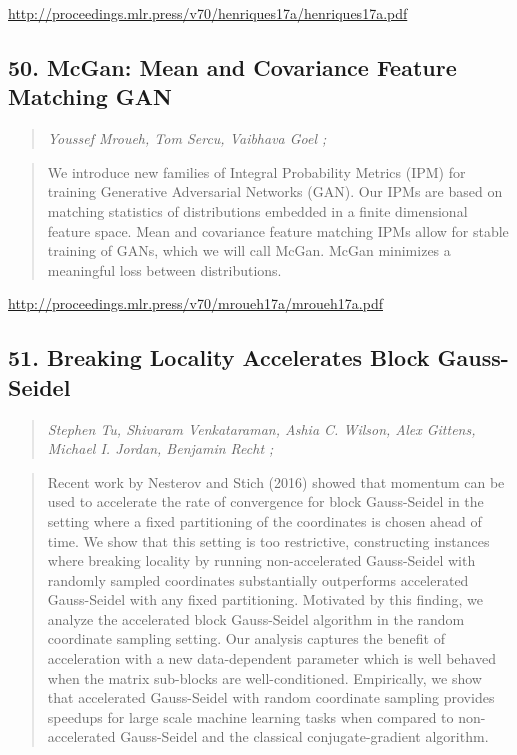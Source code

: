 \documentclass{article}
\begin{document}
\href{http://proceedings.mlr.press/v70/henriques17a/henriques17a.pdf}{http://proceedings.mlr.press/v70/henriques17a/henriques17a.pdf}

\subsection{50. McGan: Mean and Covariance Feature Matching GAN}

\begin{quote}
\footnotesize{\textit{Youssef Mroueh, Tom Sercu, Vaibhava Goel ;}}
\end{quote}

\begin{quote}
    We introduce new families of Integral Probability Metrics (IPM) for training Generative Adversarial Networks (GAN). Our IPMs are based on matching statistics of distributions embedded in a finite dimensional feature space. Mean and covariance feature matching IPMs allow for stable training of GANs, which we will call McGan. McGan minimizes a meaningful loss between distributions.  \end{quote}

\href{http://proceedings.mlr.press/v70/mroueh17a/mroueh17a.pdf}{http://proceedings.mlr.press/v70/mroueh17a/mroueh17a.pdf}

\subsection{51. Breaking Locality Accelerates Block Gauss-Seidel}

\begin{quote}
\footnotesize{\textit{Stephen Tu, Shivaram Venkataraman, Ashia C. Wilson, Alex Gittens, Michael I. Jordan, Benjamin Recht ;}}
\end{quote}

\begin{quote}
    Recent work by Nesterov and Stich (2016) showed that momentum can be used to accelerate the rate of convergence for block Gauss-Seidel in the setting where a fixed partitioning of the coordinates is chosen ahead of time. We show that this setting is too restrictive, constructing instances where breaking locality by running non-accelerated Gauss-Seidel with randomly sampled coordinates substantially outperforms accelerated Gauss-Seidel with any fixed partitioning. Motivated by this finding, we analyze the accelerated block Gauss-Seidel algorithm in the random coordinate sampling setting. Our analysis captures the benefit of acceleration with a new data-dependent parameter which is well behaved when the matrix sub-blocks are well-conditioned. Empirically, we show that accelerated Gauss-Seidel with random coordinate sampling provides speedups for large scale machine learning tasks when compared to non-accelerated Gauss-Seidel and the classical conjugate-gradient algorithm.  \end{quote}
\end{document}
